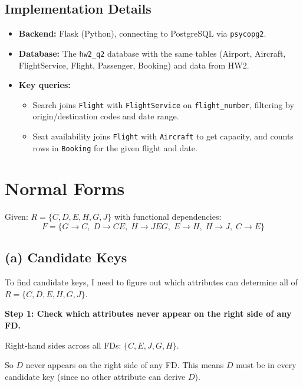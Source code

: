 \documentclass[11pt]{article}
\begin{document}
\subsection{Implementation Details}

\begin{itemize}
  \item \textbf{Backend:} Flask (Python), connecting to PostgreSQL via \texttt{psycopg2}.
  \item \textbf{Database:} The \texttt{hw2\_q2} database with the same tables (Airport, Aircraft, FlightService, Flight, Passenger, Booking) and data from HW2.
  \item \textbf{Key queries:}
  \begin{itemize}
    \item Search joins \texttt{Flight} with \texttt{FlightService} on \texttt{flight\_number}, filtering by origin/destination codes and date range.
    \item Seat availability joins \texttt{Flight} with \texttt{Aircraft} to get capacity, and counts rows in \texttt{Booking} for the given flight and date.
  \end{itemize}
\end{itemize}

\section{Normal Forms}

Given: $R = \{C, D, E, H, G, J\}$ with functional dependencies:
\[
F = \{G \to C,\; D \to CE,\; H \to JEG,\; E \to H,\; H \to J,\; C \to E\}
\]

\subsection{(a) Candidate Keys}

To find candidate keys, I need to figure out which attributes can determine all of $R = \{C, D, E, H, G, J\}$.

\medskip
\noindent\textbf{Step 1: Check which attributes never appear on the right side of any FD.}

Right-hand sides across all FDs: $\{C, E, J, G, H\}$.

So $D$ never appears on the right side of any FD. This means $D$ must be in every candidate key (since no other attribute can derive $D$).
\end{document}
